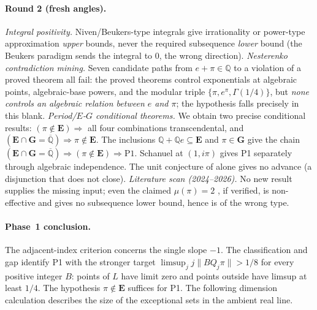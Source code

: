 \documentclass[11pt]{amsart}
\theoremstyle{definition}
\theoremstyle{remark}
\numberwithin{equation}{section}
\newcommand{\Q}{\mathbb{Q}}
\begin{document}
\paragraph{Round 2 (fresh angles).}
\emph{Integral positivity.} Niven/Beukers-type integrals give irrationality or power-type approximation \emph{upper} bounds, never the required subsequence \emph{lower} bound (the Beukers paradigm sends the integral to $0$, the wrong direction). \emph{Nesterenko contradiction mining.} Seven candidate paths from $e+\pi\in\Q$ to a violation of a proved theorem all fail: the proved theorems control exponentials at algebraic points, algebraic-base powers, and the modular triple $\{\pi,e^\pi,\Gamma(1/4)\}$, but \emph{none controls an algebraic relation between $e$ and $\pi$}; the hypothesis falls precisely in this blank. \emph{Period/$E$-$G$ conditional theorems.} We obtain two precise conditional results: $(\pi\notin\mathbf{E})\Rightarrow$ all four combinations transcendental, and $(\mathbf{E}\cap\mathbf{G}=\overline{\Q})\Rightarrow\pi\notin\mathbf{E}$. The inclusions $\Q+\Q e\subseteq\mathbf E$ and $\pi\in\mathbf G$ give the chain $(\mathbf E\cap\mathbf G=\overline{\Q})\Rightarrow(\pi\notin\mathbf E)\Rightarrow\mathrm{P1}$. Schanuel at $(1,i\pi)$ gives P1 separately through algebraic independence. The unit conjecture of \cite{FischlerRivoal2026} alone gives no advance (a disjunction that does not close). \emph{Literature scan (2024--2026).} No new result supplies the missing input; even the claimed $\mu(\pi)=2$ \cite{OpenAI2026}, if verified, is non-effective and gives no subsequence lower bound, hence is of the wrong type.

\paragraph{Phase~1 conclusion.} The adjacent-index criterion concerns the
single slope $-1$. The classification and gap identify P1 with the
stronger target $\limsup_j j\|BQ_j\pi\|>1/8$ for every positive integer
$B$: points of $L$ have limit zero and points outside have limsup at
least $1/4$. The hypothesis $\pi\notin\mathbf E$ suffices for P1.
The following dimension calculation describes the size of the
exceptional sets in the ambient real line.
\end{document}
